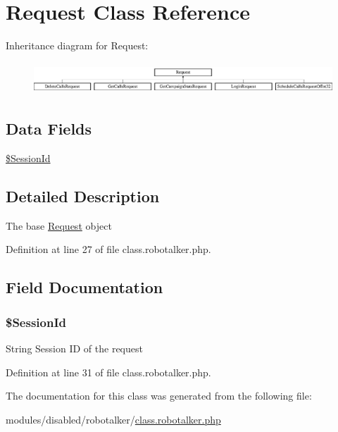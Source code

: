 \hypertarget{class_request}{\section{Request Class Reference}
\label{class_request}
}
Inheritance diagram for Request\-:\begin{figure}[H]
\begin{center}
\leavevmode
\includegraphics[height=1.204301cm]{class_request}
\end{center}
\end{figure}
\subsection*{Data Fields}
\begin{DoxyCompactItemize}
\item 
\hyperlink{class_request_af36f2c89cc01324e295786be80a30f3a}{\$\-Session\-Id}
\end{DoxyCompactItemize}


\subsection{Detailed Description}
The base \hyperlink{class_request}{Request} object 

Definition at line 27 of file class.\-robotalker.\-php.



\subsection{Field Documentation}
\hypertarget{class_request_af36f2c89cc01324e295786be80a30f3a}{
\subsubsection[{\$\-Session\-Id}]{\setlength{\rightskip}{0pt plus 5cm}\$Session\-Id}}\label{class_request_af36f2c89cc01324e295786be80a30f3a}
String Session I\-D of the request 

Definition at line 31 of file class.\-robotalker.\-php.



The documentation for this class was generated from the following file\-:\begin{DoxyCompactItemize}
\item 
modules/disabled/robotalker/\hyperlink{class_8robotalker_8php}{class.\-robotalker.\-php}\end{DoxyCompactItemize}
